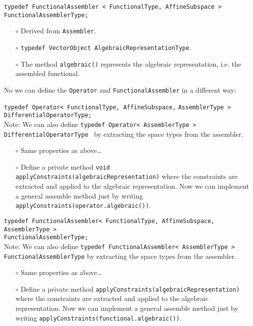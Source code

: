 \documentclass[a4paper,11pt]{article}
\numberwithin{equation}{section}
\newcommand{\CodeT}[1]{\textnormal{\texttt{#1}}}
\begin{document}
\noindent\CodeT{typedef FunctionalAssembler < FunctionalType, AffineSubspace >}\\
\CodeT{FunctionalAssemblerType;}
\begin{itemize}
	\item[$\circ$] Derived from \CodeT{Assembler}.
	\item[$\circ$] \CodeT{typedef VectorObject AlgebraicRepresentationType}.
	\item[$\circ$] The method \CodeT{algebraic()} represents the algebraic representation, i.e. the assembled functional.
\end{itemize}

\noindent No we can define the \CodeT{Operator} and \CodeT{FunctionalAssembler} in a different way:

\noindent\CodeT{typedef Operator< FunctionalType, AffineSubspace,}
\CodeT{AssemblerType > DifferentialOperatorType;}\\
Note: We can also define \CodeT{typedef Operator< AssemblerType > DifferentialOperatorType } by extracting the space types from the assembler.
\begin{itemize}
	\item[$\circ$] Same properties as above\ldots
	\item[$\circ$] Define a private method \CodeT{void applyConstraints(algebraicRepresentation)} where the constraints are extracted and applied to the algebraic representation. Now we can implement a general assemble method just by writing \CodeT{applyConstraints(operator.algebraic())}.
\end{itemize}

\noindent\CodeT{typedef FunctionalAssembler< FunctionalType, AffineSubspace, AssemblerType >}\\
\CodeT{FunctionalAssemblerType;}\\
Note: We can also define \CodeT{typedef FunctionalAssembler< AssemblerType > FunctionalAssemblerType} by extracting the space types from the assembler.
\begin{itemize}
	\item[$\circ$] Same properties as above\ldots
	\item[$\circ$] Define a private method \CodeT{applyConstraints(algebraicRepresentation)} where the constraints are extracted and applied to the algebraic representation. Now we can implement a general assemble method just by writing \CodeT{applyConstraints(functional.algebraic())}.	
\end{itemize}
\end{document}
